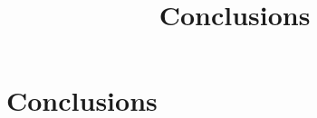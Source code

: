 \ifx\inthesis\undefined %

\title{Conclusions}

\maketitle
\else %
\chapter{Conclusions}
\label{cha:Conclusions}
\fi %


\ifx\inthesis\undefined
\printbibliography
\else\relax\fi
